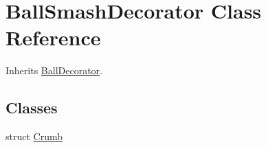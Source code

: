 \hypertarget{class_ball_smash_decorator}{}\section{Ball\+Smash\+Decorator Class Reference}
\label{class_ball_smash_decorator}


Inherits \mbox{\hyperlink{class_ball_decorator}{Ball\+Decorator}}.

\subsection*{Classes}
\begin{DoxyCompactItemize}
\item 
struct \mbox{\hyperlink{struct_ball_smash_decorator_1_1_crumb}{Crumb}}
\end{DoxyCompactItemize}
